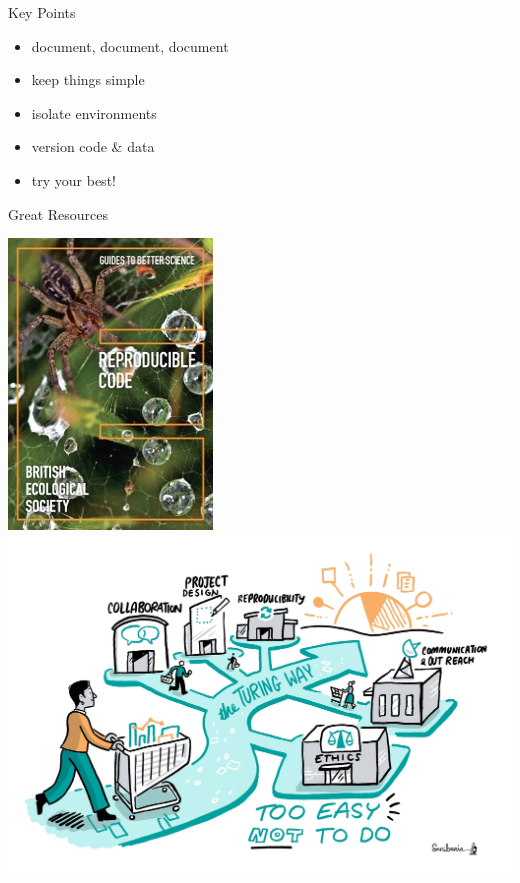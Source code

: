 \documentclass{beamer} %
\begin{document}
  \begin{frame}{Key Points}
    \begin{itemize}
      \item document, document, document
      \item keep things simple
      \item isolate environments
      \item version code \& data
      \item try your best!
    \end{itemize}
  \end{frame}

  \begin{frame}{Great Resources}
    \begin{center}
      \href{https://www.britishecologicalsociety.org/wp-content/uploads/2017/12/guide-to-reproducible-code.pdf}{\includegraphics[height=0.4\textheight]{bes_reproducible_code.jpg}}
      \hspace{1cm}
      \href{https://the-turing-way.netlify.app/}{\includegraphics[height=0.4\textheight]{turing_way.jpg}}

\end{center}
\end{frame}
\end{document}
